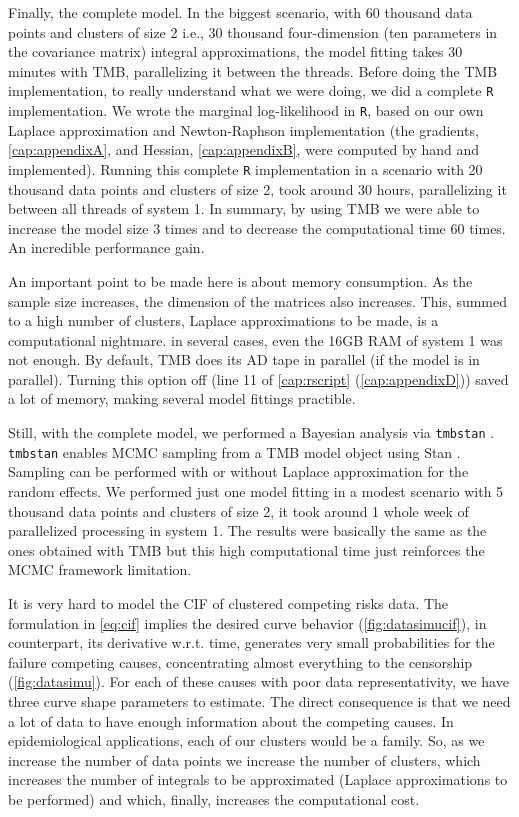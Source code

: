 Finally, the complete model. In the biggest scenario, with 60 thousand
data points and clusters of size 2 i.e., 30 thousand four-dimension (ten
parameters in the covariance matrix) integral approximations, the model
fitting takes 30 minutes with TMB, parallelizing it between the
threads. Before doing the TMB implementation, to really understand what
we were doing, we did a complete \texttt{R} implementation. We wrote the
marginal log-likelihood in \texttt{R}, based on our own Laplace
approximation and Newton-Raphson implementation (the gradients,
\autoref{cap:appendixA}, and Hessian, \autoref{cap:appendixB}, were
computed by hand and implemented). Running this complete \texttt{R}
implementation in a scenario with 20 thousand data points and clusters
of size 2, took around 30 hours, parallelizing it between all threads of
system 1. In summary, by using TMB we were able to increase the model
size 3 times and to decrease the computational time 60 times. An
incredible performance gain.

An important point to be made here is about memory consumption. As the
sample size increases, the dimension of the matrices also
increases. This, summed to a high number of clusters, Laplace
approximations to be made, is a computational nightmare. in several
cases, even the 16GB RAM of system 1 was not enough. By default, TMB
does its AD tape in parallel (if the model is in parallel). Turning this
option off (line 11 of \autoref{cap:rscript} (\autoref{cap:appendixD}))
saved a lot of memory, making several model fittings practible.

Still, with the complete model, we performed a Bayesian analysis via
\texttt{tmbstan} \cite{tmbstan}. \texttt{tmbstan} enables MCMC sampling
\cite{MCMC, Diaconis} from a TMB model object using Stan \cite{Stan,
RStan}. Sampling can be performed with or without Laplace approximation
for the random effects. We performed just one model fitting in a modest
scenario with 5 thousand data points and clusters of size 2, it took
around 1 whole week of parallelized processing in system 1. The results
were basically the same as the ones obtained with TMB but this high
computational time just reinforces the MCMC framework limitation.

It is very hard to model the CIF of clustered competing risks data. The
formulation in \autoref{eq:cif} implies the desired curve behavior
(\autoref{fig:datasimucif}), in counterpart, its derivative w.r.t. time,
generates very small probabilities for the failure competing causes,
concentrating almost everything to the censorship
(\autoref{fig:datasimu}). For each of these causes with poor data
representativity, we have three curve shape parameters to estimate. The
direct consequence is that we need a lot of data to have enough
information about the competing causes. In epidemiological applications,
each of our clusters would be a family. So, as we increase the number of
data points we increase the number of clusters, which increases the
number of integrals to be approximated (Laplace approximations to be
performed) and which, finally, increases the computational cost.

